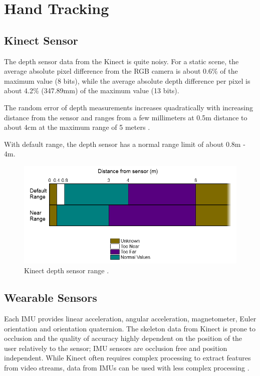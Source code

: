 \chapter{Hand Tracking}

\section{Kinect Sensor}
The depth sensor data from the Kinect is quite noisy. For a static scene, the
average absolute pixel difference from the RGB camera is about 0.6\% of the maximum value (8
bits), while the average absolute depth difference per pixel is about 4.2\%
(347.89mm) of the maximum value (13 bits).

The random error of depth measurements increases quadratically with increasing distance from the 
sensor and ranges from a few millimeters at 0.5m distance to about 4cm
at the maximum range of 5 meters \cite{khoshelham2011}.

With default range, the depth sensor has a normal range limit of about 0.8m -
4m.

\begin{figure}[h]
\centering
\includegraphics[width=\textwidth]{figures/kinect_sensor_range.png}
\caption{Kinect depth sensor range \cite{microsoft-kinect}.}
\end{figure}

\section{Wearable Sensors}
Each IMU provides linear acceleration, angular acceleration, magnetometer, Euler
orientation and orientation quaternion. The skeleton data from Kinect is prone
to occlusion and the quality of accuracy highly dependent on the position of the
user relatively to the sensor; IMU sensors are occlusion free and position
independent. While Kinect often requires complex processing to extract features
from video streams, data from IMUs can be used with less complex processing
\cite{Ruffieux2013}.

